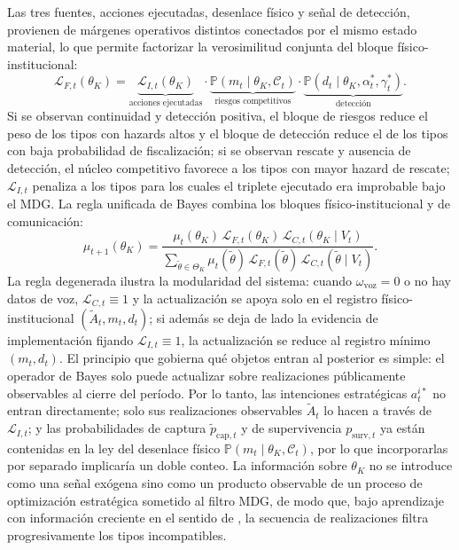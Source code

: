 \documentclass[review,authoryear,12pt]{elsarticle}
\theoremstyle{plain}
\theoremstyle{definition}
\newcommand{\Prob}{\mathbb{P}}
\newcommand{\ThetaK}{\Theta_K}
\newcommand{\1}{\mathbf{1}}
\begin{document}
Las tres fuentes, acciones ejecutadas, desenlace físico y señal de detección, provienen de márgenes operativos distintos conectados por el mismo estado material, lo que permite factorizar la verosimilitud conjunta del bloque físico-institucional:
\begin{equation}
\mathcal{L}_{F,t}(\theta_K)=\underbrace{\mathcal{L}_{I,t}(\theta_K)}_{\text{acciones ejecutadas}}\cdot\underbrace{\Prob(m_t\mid\theta_K,\mathcal{C}_t)}_{\text{riesgos competitivos}}\cdot\underbrace{\Prob(d_t\mid\theta_K,\alpha_t^\ast,\gamma_t^\ast)}_{\text{detección}}.
\label{eq:LF-joint}
\end{equation}
Si se observan continuidad y detección positiva, el bloque de riesgos reduce el peso de los tipos con hazards altos y el bloque de detección reduce el de los tipos con baja probabilidad de fiscalización; si se observan rescate y ausencia de detección, el núcleo competitivo favorece a los tipos con mayor hazard de rescate; $\mathcal{L}_{I,t}$ penaliza a los tipos para los cuales el triplete ejecutado era improbable bajo el MDG. La regla unificada de Bayes combina los bloques físico-institucional y de comunicación:
\begin{equation}
\mu_{t+1}(\theta_K)=\frac{\mu_t(\theta_K)\,\mathcal{L}_{F,t}(\theta_K)\,\mathcal{L}_{C,t}(\theta_K\mid V_t)}{\sum_{\tilde\theta\in\ThetaK}\mu_t(\tilde\theta)\,\mathcal{L}_{F,t}(\tilde\theta)\,\mathcal{L}_{C,t}(\tilde\theta\mid V_t)}.
\label{eq:bayes-update}
\end{equation}
La regla degenerada ilustra la modularidad del sistema: cuando $\omega_{\mathrm{voz}}=0$ o no hay datos de voz, $\mathcal{L}_{C,t}\equiv 1$ y la actualización se apoya solo en el registro físico-institucional $(\tilde{A}_t,m_t,d_t)$; si además se deja de lado la evidencia de implementación fijando $\mathcal{L}_{I,t}\equiv 1$, la actualización se reduce al registro mínimo $(m_t,d_t)$. El principio que gobierna qué objetos entran al posterior es simple: el operador de Bayes solo puede actualizar sobre realizaciones públicamente observables al cierre del período. Por lo tanto, las intenciones estratégicas $a_t^{i\ast}$ no entran directamente; solo sus realizaciones observables $\tilde{A}_t$ lo hacen a través de $\mathcal{L}_{I,t}$; y las probabilidades de captura $\tilde{p}_{\mathrm{cap},t}$ y de supervivencia $p_{\mathrm{surv},t}$ ya están contenidas en la ley del desenlace físico $\Prob(m_t\mid\theta_K,\mathcal{C}_t)$, por lo que incorporarlas por separado implicaría un doble conteo. La información sobre $\theta_K$ no se introduce como una señal exógena sino como un producto observable de un proceso de optimización estratégica sometido al filtro MDG, de modo que, bajo aprendizaje con información creciente en el sentido de \citet{BlackwellDubins1962}, la secuencia de realizaciones filtra progresivamente los tipos incompatibles.
\end{document}
